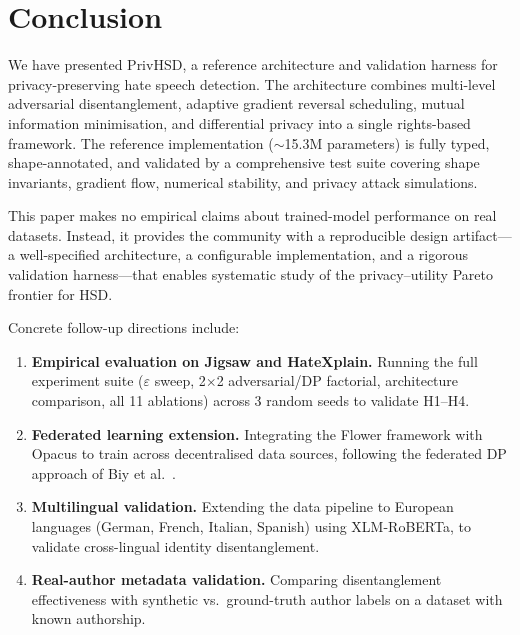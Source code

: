 \documentclass{article}
\begin{document}

\section{Conclusion}
\label{sec:conclusion}

We have presented PrivHSD, a reference architecture and validation
harness for privacy-preserving hate speech detection. The architecture
combines multi-level adversarial disentanglement, adaptive gradient
reversal scheduling, mutual information minimisation, and differential
privacy into a single rights-based framework. The reference
implementation ($\sim$15.3M parameters) is fully typed, shape-annotated,
and validated by a comprehensive test suite covering shape invariants,
gradient flow, numerical stability, and privacy attack simulations.

This paper makes no empirical claims about trained-model performance on
real datasets. Instead, it provides the community with a reproducible
design artifact---a well-specified architecture, a configurable
implementation, and a rigorous validation harness---that enables
systematic study of the privacy--utility Pareto frontier for HSD.

Concrete follow-up directions include:

\begin{enumerate}
  \item \textbf{Empirical evaluation on Jigsaw and HateXplain.} Running
        the full experiment suite ($\varepsilon$ sweep, 2$\times$2
        adversarial/DP factorial, architecture comparison, all 11
        ablations) across 3 random seeds to validate H1--H4.
  \item \textbf{Federated learning extension.} Integrating the Flower
        framework with Opacus to train across decentralised data sources,
        following the federated DP approach of Biy et
        al.~\cite{biy2025privacy}.
  \item \textbf{Multilingual validation.} Extending the data pipeline to
        European languages (German, French, Italian, Spanish) using
        XLM-RoBERTa, to validate cross-lingual identity disentanglement.
  \item \textbf{Real-author metadata validation.} Comparing disentanglement
        effectiveness with synthetic vs.\ ground-truth author labels on
        a dataset with known authorship.
\end{enumerate}
\end{document}
